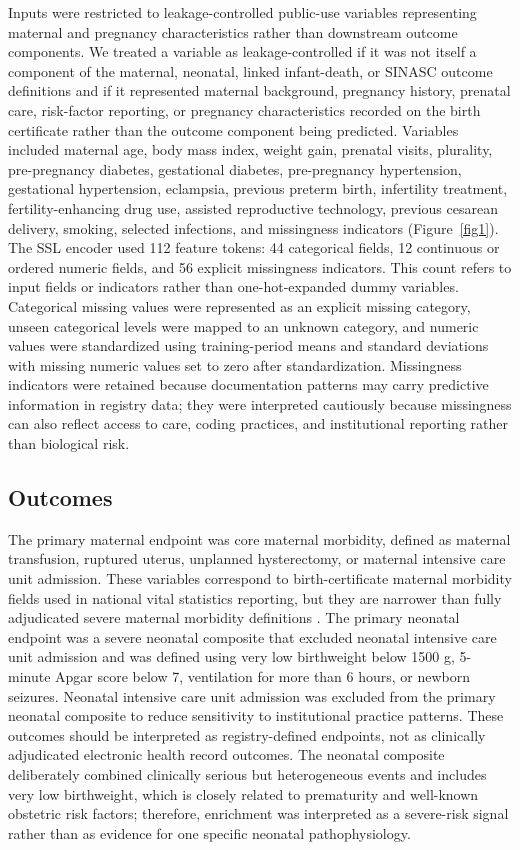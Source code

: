 \documentclass[pdflatex,sn-vancouver-num]{sn-jnl}
\begin{document}
Inputs were restricted to leakage-controlled public-use variables representing maternal and pregnancy characteristics rather than downstream outcome components. We treated a variable as leakage-controlled if it was not itself a component of the maternal, neonatal, linked infant-death, or SINASC outcome definitions and if it represented maternal background, pregnancy history, prenatal care, risk-factor reporting, or pregnancy characteristics recorded on the birth certificate rather than the outcome component being predicted. Variables included maternal age, body mass index, weight gain, prenatal visits, plurality, pre-pregnancy diabetes, gestational diabetes, pre-pregnancy hypertension, gestational hypertension, eclampsia, previous preterm birth, infertility treatment, fertility-enhancing drug use, assisted reproductive technology, previous cesarean delivery, smoking, selected infections, and missingness indicators (Figure~\ref{fig1}). The SSL encoder used 112 feature tokens: 44 categorical fields, 12 continuous or ordered numeric fields, and 56 explicit missingness indicators. This count refers to input fields or indicators rather than one-hot-expanded dummy variables. Categorical missing values were represented as an explicit missing category, unseen categorical levels were mapped to an unknown category, and numeric values were standardized using training-period means and standard deviations with missing numeric values set to zero after standardization. Missingness indicators were retained because documentation patterns may carry predictive information in registry data; they were interpreted cautiously because missingness can also reflect access to care, coding practices, and institutional reporting rather than biological risk.

\subsection{Outcomes}\label{subsec:outcomes}

The primary maternal endpoint was core maternal morbidity, defined as maternal transfusion, ruptured uterus, unplanned hysterectomy, or maternal intensive care unit admission. These variables correspond to birth-certificate maternal morbidity fields used in national vital statistics reporting, but they are narrower than fully adjudicated severe maternal morbidity definitions \cite{nchs_natality_2024_userguide,luke2018smm}. The primary neonatal endpoint was a severe neonatal composite that excluded neonatal intensive care unit admission and was defined using very low birthweight below 1500 g, 5-minute Apgar score below 7, ventilation for more than 6 hours, or newborn seizures. Neonatal intensive care unit admission was excluded from the primary neonatal composite to reduce sensitivity to institutional practice patterns. These outcomes should be interpreted as registry-defined endpoints, not as clinically adjudicated electronic health record outcomes. The neonatal composite deliberately combined clinically serious but heterogeneous events and includes very low birthweight, which is closely related to prematurity and well-known obstetric risk factors; therefore, enrichment was interpreted as a severe-risk signal rather than as evidence for one specific neonatal pathophysiology.
\end{document}
